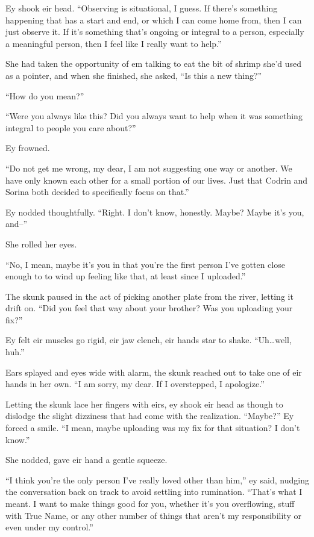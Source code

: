 Ey shook eir head. ``Observing is situational, I guess. If there's something happening that has a start and end, or which I can come home from, then I can just observe it. If it's something that's ongoing or integral to a person, especially a meaningful person, then I feel like I really want to help.''

She had taken the opportunity of em talking to eat the bit of shrimp she'd used as a pointer, and when she finished, she asked, ``Is this a new thing?''

``How do you mean?''

``Were you always like this? Did you always want to help when it was something integral to people you care about?''

Ey frowned.

``Do not get me wrong, my dear, I am not suggesting one way or another. We have only known each other for a small portion of our lives. Just that Codrin and Sorina both decided to specifically focus on that.''

Ey nodded thoughtfully. ``Right. I don't know, honestly. Maybe? Maybe it's you, and--''

She rolled her eyes.

``No, I mean, maybe it's you in that you're the first person I've gotten close enough to to wind up feeling like that, at least since I uploaded.''

The skunk paused in the act of picking another plate from the river, letting it drift on. ``Did you feel that way about your brother? Was you uploading your fix?''

Ey felt eir muscles go rigid, eir jaw clench, eir hands star to shake. ``Uh\ldots well, huh.''

Ears splayed and eyes wide with alarm, the skunk reached out to take one of eir hands in her own. ``I am sorry, my dear. If I overstepped, I apologize.''

Letting the skunk lace her fingers with eirs, ey shook eir head as though to dislodge the slight dizziness that had come with the realization. ``Maybe?'' Ey forced a smile. ``I mean, maybe uploading was my fix for that situation? I don't know.''

She nodded, gave eir hand a gentle squeeze.

``I think you're the only person I've really loved other than him,'' ey said, nudging the conversation back on track to avoid settling into rumination. ``That's what I meant. I want to make things good for you, whether it's you overflowing, stuff with True Name, or any other number of things that aren't my responsibility or even under my control.''

